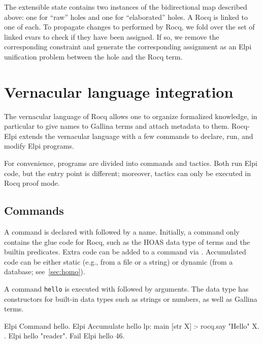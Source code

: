 \documentclass[a4paper, 11pt]{book}
\begin{document}
\noindent
The extensible state contains two instances of the bidirectional map
described above: one for ``raw'' holes and one for ``elaborated'' holes. A Rocq
 is linked to one of each.
To propagate changes to  performed by Rocq, we fold
over the set of linked evars to check if they have been assigned. If so, we
remove the corresponding  constraint and generate the corresponding
assignment as an Elpi unification problem between the hole and the Rocq term.



\section{Vernacular language integration}


The vernacular language of Rocq allows one to organize formalized knowledge,
in particular to give names to Gallina terms and attach metadata to them.
Rocq-Elpi extends the vernacular language with a few commands to declare, run,
and modify Elpi programs.

For convenience, programs are divided into commands and tactics. Both run Elpi
code, but the entry point is different; moreover, tactics can only be executed
in Rocq proof mode.

\subsection{Commands}

A command is declared with  followed by a name. Initially,
a command only contains the glue code for Rocq, such as the HOAS data type of
terms and the builtin predicates. Extra code can be added to a command via
. Accumulated code can be either static (e.g., from a
file or a string) or dynamic (from a database; see~\cref{sec:homo}).

A command \texttt{hello} is executed with  followed by
arguments. The  data type has constructors for built-in data
types such as strings or numbers, as well as Gallina terms.

\begin{rocqcode}
Elpi Command hello.
Elpi Accumulate hello lp:{{
  main [str X] :- rocq.say "Hello" X.
}}.
Elpi hello "reader".
Fail Elpi hello 46.
\end{rocqcode}
\end{document}
